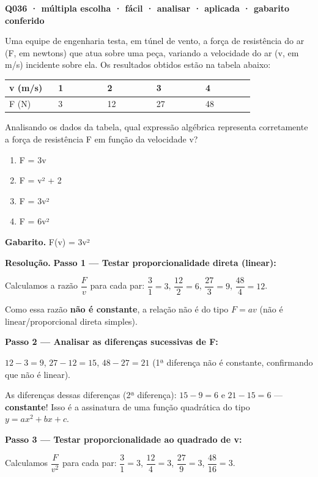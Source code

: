 \documentclass[11pt,a4paper]{article}
\begin{document}
\bigskip\noindent\textbf{Q036 · múltipla escolha · fácil · analisar · aplicada · gabarito conferido}\par\nopagebreak
Uma equipe de engenharia testa, em túnel de vento, a força de resistência do ar (F, em newtons) que atua sobre uma peça, variando a velocidade do ar (v, em m/s) incidente sobre ela. Os resultados obtidos estão na tabela abaixo:

\begin{center}
\begin{tabular}{|p{0.172\linewidth}|p{0.172\linewidth}|p{0.172\linewidth}|p{0.172\linewidth}|p{0.172\linewidth}|}
\hline
\textbf{v (m/s)} & \textbf{1} & \textbf{2} & \textbf{3} & \textbf{4} \\
\hline
F (N) & 3 & 12 & 27 & 48 \\
\hline
\end{tabular}
\end{center}

Analisando os dados da tabela, qual expressão algébrica representa corretamente a força de resistência F em função da velocidade v?
\begin{enumerate}[label=(\alph*)]
\item F = 3v
\item F = v² + 2
\item F = 3v²
\item F = 6v²
\end{enumerate}

\textbf{Gabarito.} F(v) = 3v²

\textbf{Resolução.} \textbf{Passo 1 — Testar proporcionalidade direta (linear):}

Calculamos a razão $\dfrac{F}{v}$ para cada par: $\dfrac{3}{1}=3$, $\dfrac{12}{2}=6$, $\dfrac{27}{3}=9$, $\dfrac{48}{4}=12$.

Como essa razão \textbf{não é constante}, a relação não é do tipo $F = av$ (não é linear/proporcional direta simples).

\textbf{Passo 2 — Analisar as diferenças sucessivas de F:}

$12-3=9$, $27-12=15$, $48-27=21$ (1ª diferença não é constante, confirmando que não é linear).

As diferenças dessas diferenças (2ª diferença): $15-9=6$ e $21-15=6$ — \textbf{constante}! Isso é a assinatura de uma função quadrática do tipo $y=ax^2+bx+c$.

\textbf{Passo 3 — Testar proporcionalidade ao quadrado de v:}

Calculamos $\dfrac{F}{v^2}$ para cada par: $\dfrac{3}{1}=3$, $\dfrac{12}{4}=3$, $\dfrac{27}{9}=3$, $\dfrac{48}{16}=3$.
\end{document}
